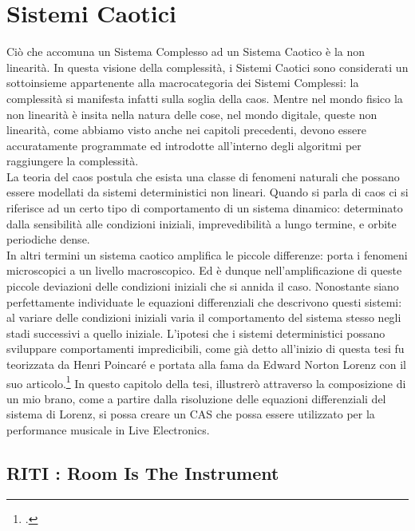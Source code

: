 \section{Sistemi Caotici}
\label{sec:Sistemi Caotici}

Ciò che accomuna un Sistema Complesso ad un Sistema Caotico è la non linearità.
In questa visione della complessità, i Sistemi Caotici sono considerati un sottoinsieme 
appartenente alla macrocategoria dei Sistemi Complessi: la complessità 
si manifesta infatti sulla soglia della caos. 
Mentre nel mondo fisico la non linearità è insita nella natura
delle cose, nel mondo digitale, queste non linearità, come abbiamo visto
anche nei capitoli precedenti, devono essere accuratamente
programmate ed introdotte all’interno degli algoritmi per raggiungere la complessità. \\
La teoria del caos postula che esista una classe di fenomeni naturali che
possano essere modellati da sistemi deterministici non lineari.
Quando si parla di caos ci si riferisce ad un certo tipo di comportamento di
un sistema dinamico: determinato dalla sensibilità alle condizioni iniziali,
imprevedibilità a lungo termine, e orbite periodiche dense. \\ 
In altri termini un sistema caotico amplifica le piccole differenze: porta i fenomeni microscopici
a un livello macroscopico. Ed è dunque nell’amplificazione di queste piccole
deviazioni delle condizioni iniziali che si annida il caso.
Nonostante siano perfettamente individuate le equazioni differenziali che
descrivono questi sistemi: al variare delle condizioni iniziali 
varia il comportamento del sistema stesso negli stadi successivi a quello iniziale.
L’ipotesi che i sistemi deterministici possano sviluppare comportamenti impredicibili, 
come già detto all'inizio di questa tesi fu teorizzata da Henri Poincaré e portata alla
fama da Edward Norton Lorenz con il suo articolo.\footcite{Lorenzdnf}
In questo capitolo della tesi, illustrerò attraverso la composizione di un mio brano, 
come a partire dalla risoluzione delle equazioni differenziali del sistema di Lorenz, si possa
creare un CAS che possa essere utilizzato per la
performance musicale in Live Electronics.

\subsection{RITI : Room Is The Instrument}
\label{RITI : Room Is The Instrument}

